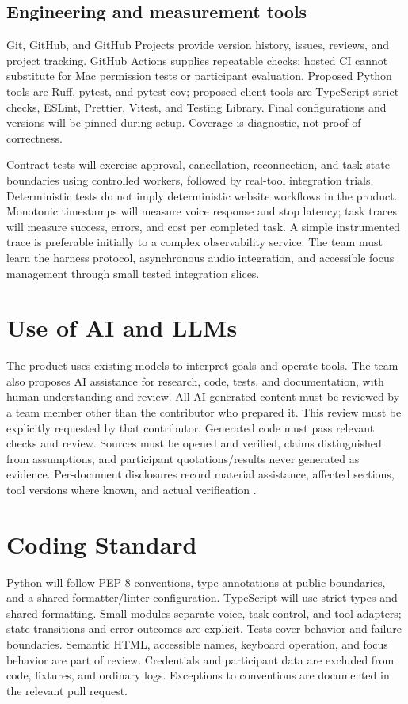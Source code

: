 \documentclass[11pt]{article}
\begin{document}
\subsection{Engineering and measurement tools}
Git, GitHub, and GitHub Projects provide version history, issues, reviews, and project tracking.
GitHub Actions supplies repeatable checks; hosted CI cannot substitute for Mac
permission tests or participant evaluation. Proposed Python tools are Ruff,
pytest, and pytest-cov; proposed client tools are TypeScript strict checks,
ESLint, Prettier, Vitest, and Testing Library. Final configurations and versions
will be pinned during setup. Coverage is diagnostic, not proof of correctness.

Contract tests will exercise approval, cancellation, reconnection, and task-state
boundaries using controlled workers, followed by real-tool integration trials.
Deterministic tests do not imply deterministic website workflows in the product.
Monotonic timestamps will measure voice response and stop latency; task traces
will measure success, errors, and cost per completed task. A simple instrumented
trace is preferable initially to a complex observability service. The team must
learn the harness protocol, asynchronous audio integration, and accessible focus
management through small tested integration slices.

\section{Use of AI and LLMs}
The product uses existing models to interpret goals and operate tools. The team
also proposes AI assistance for research, code, tests, and documentation, with
human understanding and review. All AI-generated content must be reviewed by a
team member other than the contributor who prepared it. This review must be explicitly
requested by that contributor. Generated code must pass relevant checks and review.
Sources must be opened and verified, claims distinguished from assumptions, and
participant quotations/results never generated as evidence. Per-document disclosures
record material assistance, affected sections, tool versions where known,
and actual verification \citep{CourseOutline}.

\section{Coding Standard}
Python will follow PEP 8 conventions, type annotations at public boundaries, and
a shared formatter/linter configuration. TypeScript will use strict types and
shared formatting. Small modules separate voice, task control, and tool adapters;
state transitions and error outcomes are explicit. Tests cover behavior and
failure boundaries. Semantic HTML, accessible names, keyboard operation, and
focus behavior are part of review. Credentials and participant data are excluded
from code, fixtures, and ordinary logs. Exceptions to conventions are documented
in the relevant pull request.
\end{document}
